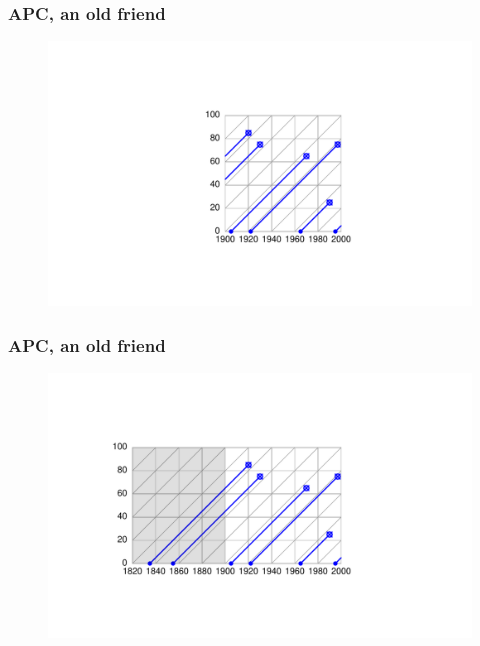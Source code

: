 \documentclass[20pt]{beamer}
\begin{document}
\begin{frame}
\frametitle{APC, an old friend}
\begin{figure}[b]
    \centering
    \includegraphics{Figures/LabPres/APC2.pdf}
\end{figure} 
\end{frame}

\begin{frame}
\frametitle{APC, an old friend}
\begin{figure}[b]
    \centering
    \includegraphics{Figures/LabPres/APC3.pdf}
\end{figure} 
\end{frame}
\end{document}
